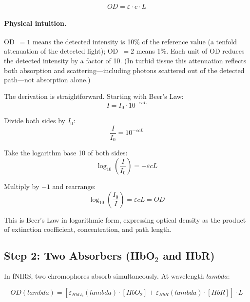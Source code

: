 \documentclass[12pt]{article}
\def\lambda{lambda}%
\def\text#1{#1}%
\begin{document}
\begin{equation}
\text{OD} = \varepsilon \cdot c \cdot L
\end{equation}

\paragraph{Physical intuition.} OD~$=1$ means the detected intensity is 10\% of the reference value (a tenfold attenuation of the detected light); OD~$=2$ means 1\%. Each unit of OD reduces the detected intensity by a factor of 10. (In turbid tissue this attenuation reflects both absorption and scattering---including photons scattered out of the detected path---not absorption alone.)

The derivation is straightforward. Starting with Beer's Law:
\begin{equation}
I = I_0 \cdot 10^{-\varepsilon c L}
\end{equation}

Divide both sides by $I_0$:
\begin{equation}
\frac{I}{I_0} = 10^{-\varepsilon c L}
\end{equation}

Take the logarithm base 10 of both sides:
\begin{equation}
\log_{10}\left(\frac{I}{I_0}\right) = -\varepsilon c L
\end{equation}

Multiply by $-1$ and rearrange:
\begin{equation}
\log_{10}\left(\frac{I_0}{I}\right) = \varepsilon c L = \text{OD}
\end{equation}

This is Beer's Law in logarithmic form, expressing optical density as the product of extinction coefficient, concentration, and path length.

\subsection{Step 2: Two Absorbers (\texorpdfstring{HbO$_2$}{HbO2} and HbR)}

In fNIRS, two chromophores absorb simultaneously. At wavelength $\lambda$:

\begin{equation}
\text{OD}(\lambda) = \left[\varepsilon_{\text{HbO}_2}(\lambda) \cdot [\text{HbO}_2] + \varepsilon_{\text{HbR}}(\lambda) \cdot [\text{HbR}]\right] \cdot L
\end{equation}
\end{document}

